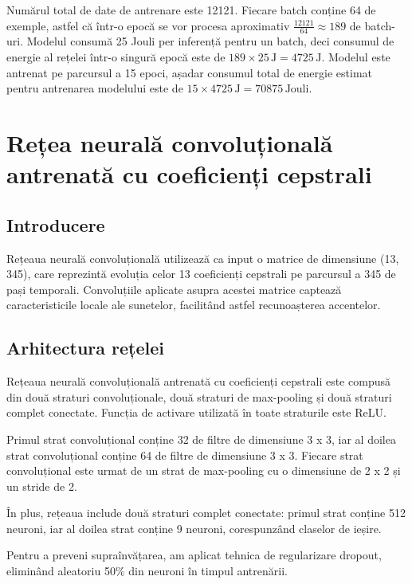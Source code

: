 Numărul total de date de antrenare este 12121. Fiecare batch conține 64 de exemple, astfel că într-o epocă se vor procesa aproximativ \( \frac{12121}{64} \approx 189 \) de batch-uri. Modelul consumă 25 Jouli per inferență pentru un batch, deci consumul de energie al rețelei într-o singură epocă este de \( 189 \times 25 \, \text{J} = 4725 \, \text{J} \). Modelul este antrenat pe parcursul a 15 epoci, așadar consumul total de energie estimat pentru antrenarea modelului este de \( 15 \times 4725 \, \text{J} = 70875 \, \text{Jouli} \).


\section{Rețea neurală convoluțională antrenată cu coeficienți cepstrali}

\subsection{Introducere}

Rețeaua neurală convoluțională utilizează ca input o matrice de dimensiune (13, 345), care reprezintă evoluția celor 13 coeficienți cepstrali pe parcursul a 345 de pași temporali. Convoluțiile aplicate asupra acestei matrice captează caracteristicile locale ale sunetelor, facilitând astfel recunoașterea accentelor.

\subsection{Arhitectura rețelei}

Rețeaua neurală convoluțională antrenată cu coeficienți cepstrali este compusă din două straturi convoluționale, două straturi de max-pooling și două straturi complet conectate. Funcția de activare utilizată în toate straturile este ReLU.

Primul strat convoluțional conține 32 de filtre de dimensiune 3 x 3, iar al doilea strat convoluțional conține 64 de filtre de dimensiune 3 x 3. Fiecare strat convoluțional este urmat de un strat de max-pooling cu o dimensiune de 2 x 2 și un stride de 2.

În plus, rețeaua include două straturi complet conectate: primul strat conține 512 neuroni, iar al doilea strat conține 9 neuroni, corespunzând claselor de ieșire.

Pentru a preveni supraînvățarea, am aplicat tehnica de regularizare dropout, eliminând aleatoriu 50\% din neuroni în timpul antrenării.

